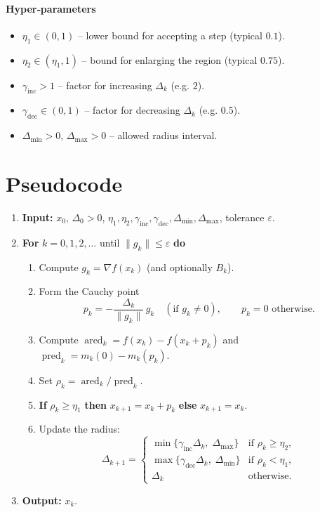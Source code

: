 \documentclass[11pt]{article}
\begin{document}
\paragraph{Hyper‑parameters}
\begin{itemize}[noitemsep]
\item $\eta_{1}\in(0,1)$ – lower bound for accepting a step (typical $0.1$).
\item $\eta_{2}\in(\eta_{1},1)$ – bound for enlarging the region (typical $0.75$).
\item $\gamma_{\text{inc}}>1$ – factor for increasing $\Delta_{k}$ (e.g. $2$).
\item $\gamma_{\text{dec}}\in(0,1)$ – factor for decreasing $\Delta_{k}$ (e.g. $0.5$).
\item $\Delta_{\min}>0$, $\Delta_{\max}>0$ – allowed radius interval.
\end{itemize}

\section*{Pseudocode}
\begin{enumerate}
\item \textbf{Input:} $x_{0}$, $\Delta_{0}>0$, $\eta_{1},\eta_{2},\gamma_{\text{inc}},\gamma_{\text{dec}},\Delta_{\min},\Delta_{\max}$, tolerance $\varepsilon$.
\item \textbf{For} $k=0,1,2,\dots$ until $\|g_{k}\|\le\varepsilon$ \textbf{do}
\begin{enumerate}
\item Compute $g_{k}=\nabla f(x_{k})$ (and optionally $B_{k}$).
\item Form the Cauchy point 
\[
p_{k}= -\frac{\Delta_{k}}{\|g_{k}\|}\,g_{k}\quad (\text{if }g_{k}\neq0),\qquad p_{k}=0\text{ otherwise}.
\]
\item Compute $\operatorname{ared}_{k}=f(x_{k})-f(x_{k}+p_{k})$ and 
$\operatorname{pred}_{k}=m_{k}(0)-m_{k}(p_{k})$.
\item Set $\rho_{k}= \operatorname{ared}_{k}/\operatorname{pred}_{k}$.
\item \textbf{If} $\rho_{k}\ge\eta_{1}$ \textbf{then} $x_{k+1}=x_{k}+p_{k}$ \textbf{else} $x_{k+1}=x_{k}$.
\item Update the radius:
\[
\Delta_{k+1}= \begin{cases}
\min\{\gamma_{\text{inc}}\Delta_{k},\;\Delta_{\max}\} & \text{if }\rho_{k}\ge\eta_{2},\\[4pt]
\max\{\gamma_{\text{dec}}\Delta_{k},\;\Delta_{\min}\} & \text{if }\rho_{k}<\eta_{1},\\[4pt]
\Delta_{k} & \text{otherwise.}
\end{cases}
\]
\end{enumerate}
\item \textbf{Output:} $x_{k}$.
\end{enumerate}
\end{document}
